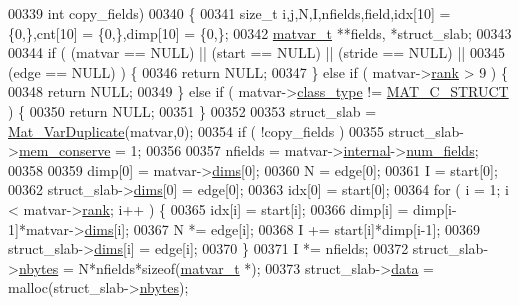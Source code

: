 \begin{DoxyCode}
00339     \textcolor{keywordtype}{int} copy\_fields)
00340 \{
00341     \textcolor{keywordtype}{size\_t} i,j,N,I,nfields,field,idx[10] = \{0,\},cnt[10] = \{0,\},dimp[10] = \{0,\};
00342     \hyperlink{group___m_a_t_structmatvar__t}{matvar\_t} **fields, *struct\_slab;
00343 
00344     \textcolor{keywordflow}{if} ( (matvar == NULL) || (start == NULL) || (stride == NULL) ||
00345          (edge == NULL) ) \{
00346         \textcolor{keywordflow}{return} NULL;
00347     \} \textcolor{keywordflow}{else} \textcolor{keywordflow}{if} ( matvar->\hyperlink{group___m_a_t_a84ba70c96ded13cc555fa75b768d9921}{rank} > 9 ) \{
00348         \textcolor{keywordflow}{return} NULL;
00349     \} \textcolor{keywordflow}{else} \textcolor{keywordflow}{if} ( matvar->\hyperlink{group___m_a_t_aff13035bf3265dd7d9425e5d40c839d4}{class\_type} != \hyperlink{group___m_a_t_ggad4d60ae7b709fc81bfd744fb4c857c40acb467c7749c80902b798134c729bb521}{MAT\_C\_STRUCT} ) \{
00350         \textcolor{keywordflow}{return} NULL;
00351     \}
00352 
00353     struct\_slab = \hyperlink{group___m_a_t_ga7ef80c5d99d7918b2b09db3bea106ecc}{Mat\_VarDuplicate}(matvar,0);
00354     \textcolor{keywordflow}{if} ( !copy\_fields )
00355         struct\_slab->\hyperlink{group___m_a_t_aff20e87a00691c97340ab07656a13ee7}{mem\_conserve} = 1;
00356 
00357     nfields = matvar->\hyperlink{group___m_a_t_a6e97e3ed9f40c49322c18561c2a94e92}{internal}->\hyperlink{structmatvar__internal_a93fc447484f455eddf9334f2e9e411c2}{num\_fields};
00358 
00359     dimp[0] = matvar->\hyperlink{group___m_a_t_a8e01234e1c862ce3472bb37f5a09b92c}{dims}[0];
00360     N = edge[0];
00361     I = start[0];
00362     struct\_slab->\hyperlink{group___m_a_t_a8e01234e1c862ce3472bb37f5a09b92c}{dims}[0] = edge[0];
00363     idx[0] = start[0];
00364     \textcolor{keywordflow}{for} ( i = 1; i < matvar->\hyperlink{group___m_a_t_a84ba70c96ded13cc555fa75b768d9921}{rank}; i++ ) \{
00365         idx[i]  = start[i];
00366         dimp[i] = dimp[i-1]*matvar->\hyperlink{group___m_a_t_a8e01234e1c862ce3472bb37f5a09b92c}{dims}[i];
00367         N *= edge[i];
00368         I += start[i]*dimp[i-1];
00369         struct\_slab->\hyperlink{group___m_a_t_a8e01234e1c862ce3472bb37f5a09b92c}{dims}[i] = edge[i];
00370     \}
00371     I *= nfields;
00372     struct\_slab->\hyperlink{group___m_a_t_abf1c844540503be2df9bb3db93cfe307}{nbytes}    = N*nfields*\textcolor{keyword}{sizeof}(\hyperlink{group___m_a_t_structmatvar__t}{matvar\_t} *);
00373     struct\_slab->\hyperlink{group___m_a_t_a5672978efa230bbdecdf38ede781f7fa}{data} = malloc(struct\_slab->\hyperlink{group___m_a_t_abf1c844540503be2df9bb3db93cfe307}{nbytes});

\end{DoxyCode}
